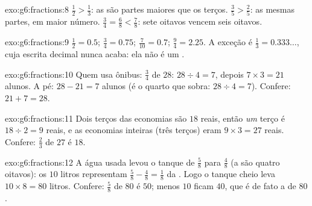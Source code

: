 \begin{solution}{exo:g6:fractions:8}
$\frac12 > \frac13$: as  são partes maiores que os terços.
$\frac35 > \frac25$: as mesmas partes, em maior número.
$\frac34 = \frac68 < \frac78$: sete oitavos vencem seis oitavos.
\end{solution}

\begin{solution}{exo:g6:fractions:9}
$\frac12 = 0.5$; \quad $\frac34 = 0.75$; \quad
$\frac{7}{10} = 0.7$; \quad $\frac94 = 2.25$. A exceção é
$\frac13 = 0.333\dots$, cuja escrita decimal nunca acaba: ela não é um
.
\end{solution}

\begin{solution}{exo:g6:fractions:10}
Quem usa ônibus: $\frac34$ de $28$: $28 \div 4 = 7$, depois
$7 \times 3 = 21$ alunos. A pé: $28 - 21 = 7$ alunos (é o quarto que
sobra: $28 \div 4 = 7$). Confere: $21 + 7 = 28$.
\end{solution}

\begin{solution}{exo:g6:fractions:11}
Dois terços das economias são $18$ reais, então \emph{um} terço é
$18 \div 2 = 9$ reais, e as economias inteiras (três terços) eram
$9 \times 3 = 27$ reais. Confere: $\frac23$ de $27$ é $18$.
\end{solution}

\begin{solution}{exo:g6:fractions:12}
A água usada levou o tanque de $\frac58$ para $\frac48$ (a  são
quatro oitavos): os $10$ litros representam
$\frac58 - \frac48 = \frac18$ da . Logo o tanque cheio leva
$10 \times 8 = 80$ litros. Confere: $\frac58$ de $80$ é $50$; menos
$10$ ficam $40$, que é de fato a  de $80$.
\end{solution}

